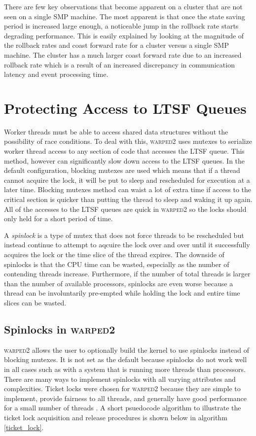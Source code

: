 \documentclass[11pt]{book}
\begin{document}
There are few key observations that become apparent on a cluster that are not seen on a single SMP
machine.  The most apparent is that once the state saving period is increased large enough, a
noticeable jump in the rollback rate starts degrading performance.  This is easily explained by
looking at the magnitude of the rollback rates and coast forward rate for a cluster versus a single
SMP machine.  The cluster has a much larger coast forward rate due to an increased rollback rate
which is a result of an increased discrepancy in communication latency and event processing time.

\section{Protecting Access to LTSF Queues}

Worker threads must be able to access shared data structures without the possibility of race
conditions.  To deal with this, \textsc{warped2} uses mutexes to serialize worker thread access to
any section of code that accesses the LTSF queue.  This method, however can significantly slow down
access to the LTSF queues.  In the default configuration, blocking mutexes are used which means that
if a thread cannot acquire the lock, it will be put to sleep and rescheduled for execution at a
later time.  Blocking mutexes method can waist a lot of extra time if access to the critical section
is quicker than putting the thread to sleep and waking it up again.  All of the accesses to the LTSF
queues are quick in \textsc{warped2} so the locks should only held for a short period of time.

A \emph{spinlock} is a type of mutex that does not force threads to be rescheduled but
instead continue to attempt to aqcuire the lock over and over until it successfully acquires
the lock or the time slice of the thread expires.  The downside of spinlocks is that the CPU time
can be wasted, especially as the number of contending threads increase.  Furthermore, if the
number of total threads is larger than the number of available processors, spinlocks are
even worse because a thread can be involuntarily pre-empted while holding the lock and entire
time slices can be wasted.

\subsection{Spinlocks in \textsc{warped2}}

\textsc{warped2} allows the user to optionally build the kernel to use spinlocks instead of blocking
mutexes.  It is not set as the default because spinlocks do not work well in all cases such as with
a system that is running more threads than processors.  There are many ways to implement spinlocks
with all varying attributes and complexities.  Ticket locks were chosen for \textsc{warped2} because
they are simple to implement, provide fairness to all threads, and generally have good performance
for a small number of threads \cite{lockless-10}.  A short psuedocode algorithm to illustrate the
ticket lock acquisition and release procedures is shown below in algorithm \ref{ticket_lock}.
\end{document}
